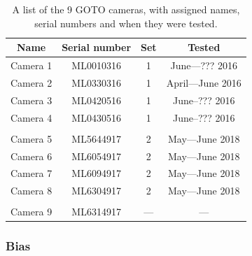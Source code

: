 \begin{colsection}
\begin{colsection}
\begin{table}[t]
    \begin{center}
        \begin{tabular}{cccc} %
            Name     & Serial number & Set & Tested     \\
            \midrule
            Camera 1 & ML0010316     & 1   & June---??? 2016 \\
            Camera 2 & ML0330316     & 1   & April---June 2016 \\
            Camera 3 & ML0420516     & 1   & June--??? 2016 \\
            Camera 4 & ML0430516     & 1   & June--??? 2016 \\
            \\
            Camera 5 & ML5644917     & 2   & May---June 2018 \\
            Camera 6 & ML6054917     & 2   & May---June 2018 \\
            Camera 7 & ML6094917     & 2   & May---June 2018 \\
            Camera 8 & ML6304917     & 2   & May---June 2018 \\
            \\
            Camera 9 & ML6314917     & --- & --- \\
        \end{tabular}
    \end{center}
    \caption[List of GOTO cameras]{
        A list of the 9 GOTO cameras, with assigned names, serial numbers and when they were tested.
        }\label{tab:cameras}
\end{table}


\newpage
\subsubsection{Bias}


\end{colsection}
\end{colsection}
